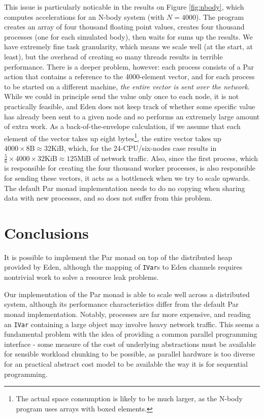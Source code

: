 \documentclass[a4paper, oneside, final]{article}
\begin{document}
This issue is particularly noticable in the results on Figure
\ref{fig:nbody}, which computes accelerations for an N-body system
(with $N=4000$).  The program creates an array of four thousand
floating point values, creates four thousand processes (one for each
simulated body), then waits for sums up the results.  We have
extremely fine task granularity, which means we scale well (at the
start, at least), but the overhead of creating so many threads results
in terrible performance.  There is a deeper problem, however: each
process consists of a Par action that contains a reference to the
4000-element vector, and for each process to be started on a different
machine, \textit{the entire vector is sent over the network}.  While
we could in principle send the value only once to each node, it is not
practically feasible, and Eden does not keep track of whether some
specific value has already been sent to a given node and so performs
an extremely large amount of extra work.  As a back-of-the-envelope
calculation, if we assume that each element of the vector takes up
eight bytes\footnote{The actual space consumption is likely to be much
  larger, as the N-body program uses arrays with boxed elements.}, the
entire vector takes up $4000\times8\text{B}\approx 32\text{KiB}$,
which, for the 24-CPU/six-nodes case results in $\frac{5}{6} \times
4000 \times 32\text{KiB}\approx 125\text{MiB}$ of network traffic.
Also, since the first process, which is responsible for creating the
four thousand worker processes, is also responsible for sending these
vectors, it acts as a bottleneck when we try to scale upwards.  The
default Par monad implementation needs to do no copying when sharing
data with new processes, and so does not suffer from this problem.

\section{Conclusions}

It is possible to implement the Par monad on top of the distributed
heap provided by Eden, although the mapping of \texttt{IVar}s to Eden
channels requires nontrivial work to solve a resource leak problems.

Our implementation of the Par monad is able to scale well across a
distributed system, although its performance characteristics differ
from the default Par monad implementation.  Notably, processes are far
more expensive, and reading an \texttt{IVar} containing a large object
may involve heavy network traffic.  This seems a fundamental problem
with the idea of providing a common parallel programming interface -
some measure of the cost of underlying abstractions must be available
for sensible workload chunking to be possible, as parallel hardware is
too diverse for an practical abstract cost model to be available the
way it is for sequential programming.
\end{document}
